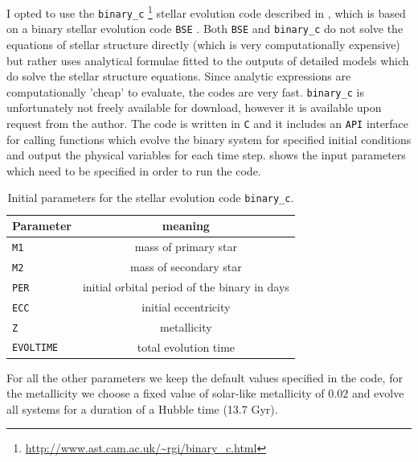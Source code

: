 \documentclass[ twoside,openright,titlepage,numbers=noenddot,headinclude,%
                footinclude=true,cleardoublepage=empty,abstractoff, %
                BCOR=5mm,paper=a4,fontsize=11pt,%
                american,%
                ]{scrreprt}
\begin{document}
I opted to use the \texttt{binary\_c}
\footnote{\url{http://www.ast.cam.ac.uk/~rgi/binary_c.html}}
stellar evolution code described in
\cite{izzard2004,izzard2006,izzard2009}, which is based on a binary
stellar evolution code \texttt{BSE} \citep{hurley2002}. Both \texttt{BSE}
and \texttt{binary\_c} do not solve the equations of stellar structure directly
(which is very computationally expensive) but rather uses analytical formulae
fitted to the outputs of detailed models which do solve the stellar structure
equations. Since analytic expressions are computationally 'cheap' to evaluate,
the codes are very fast. \texttt{binary\_c}
is unfortunately not freely available for download, however it is available
upon request from the author. The code is written in \texttt{C} and it
includes an \texttt{API} interface for calling functions which 
evolve the binary system for specified initial conditions and output the
physical variables for each time step.  shows
the input parameters which need to be specified in order to run the code.
\begin{table}[h!]
\centering
\begin{tabular}{lc}
\toprule
    Parameter & meaning\\
\midrule
    \texttt{M1} & mass of primary star\\
    \texttt{M2} & mass of secondary star\\
    \texttt{PER} & initial orbital period of the binary in days\\
    \texttt{ECC} & initial eccentricity\\
    \texttt{Z} & metallicity\\
    \texttt{EVOLTIME} & total evolution time\\
\bottomrule
\end{tabular}
    \caption{Initial parameters for the stellar evolution code \texttt{binary\_c}.}
\label{table:binary_c_params}
\end{table}
For all the other parameters we keep the default values specified in the code, for 
the metallicity we choose a fixed value of solar-like metallicity of $0.02$ and 
evolve all systems for a duration of a Hubble time (13.7 Gyr).
\end{document}
